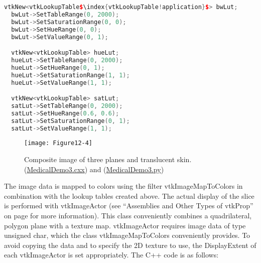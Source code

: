\begin{lstlisting}[language=C++, caption={Lookup tables for the sectioning planes.}, escapechar=\$]
  vtkNew<vtkLookupTable$\index{vtkLookupTable!application}$> bwLut;
  bwLut->SetTableRange(0, 2000);
  bwLut->SetSaturationRange(0, 0);
  bwLut->SetHueRange(0, 0);
  bwLut->SetValueRange(0, 1);

  vtkNew<vtkLookupTable> hueLut;
  hueLut->SetTableRange(0, 2000);
  hueLut->SetHueRange(0, 1);
  hueLut->SetSaturationRange(1, 1);
  hueLut->SetValueRange(1, 1);

  vtkNew<vtkLookupTable> satLut;
  satLut->SetTableRange(0, 2000);
  satLut->SetHueRange(0.6, 0.6);
  satLut->SetSaturationRange(0, 1);
  satLut->SetValueRange(1, 1);
\end{lstlisting}

\begin{figure}[!htb]
    \centering
    \texttt{[image: Figure12-4]}
    \caption{Composite image of three planes and translucent skin.(\href{https://lorensen.github.io/VTKExamples/site/Cxx/Medical/MedicalDemo3/}{MedicalDemo3.cxx}) and (\href{https://lorensen.github.io/VTKExamples/site/Python/Medical/MedicalDemo3/}{MedicalDemo3.py})}
    \label{fig:Figure12-4}
\end{figure}

\noindent The image data is mapped to colors using the filter vtkImageMapToColors in combination with the lookup tables created above. The actual display of the slice is performed with vtkImageActor (see ``Assemblies and Other Types of vtkProp'' on page \pageref{subsubsec:assemblies_vtkprop} for more information). This class conveniently combines a quadrilateral, polygon plane with a texture map. vtkImageActor requires image data of type unsigned char, which the class vtkImageMapToColors conveniently provides. To avoid copying the data and to specify the 2D texture to use, the DisplayExtent of each vtkImageActor is set appropriately. The C++ code is as follows:

